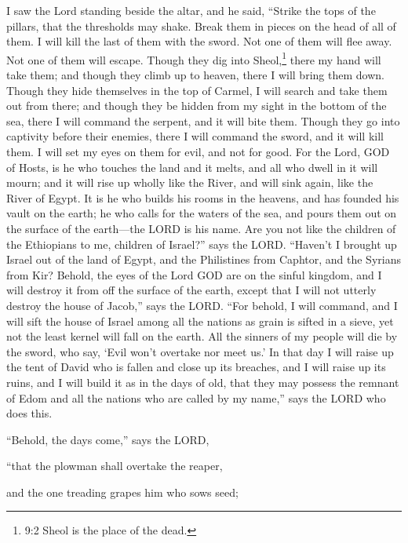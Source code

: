 	
	\mychapter{} \myverse*{}I saw the Lord standing beside the altar, and he said, “Strike
	the tops of the pillars, that the thresholds may shake. Break them in pieces on the head of all of them.
	I will kill the last of them with the sword. Not one of them will flee away. Not one of them will escape.
	\myverse{}Though they dig into Sheol,\footnote{9:2 Sheol is the place of the dead.} there my hand will take them; and though they climb
	up to heaven, there I will bring them down.
	\myverse{}Though they hide themselves in the top of Carmel, I will search and take them
	out from there; and though they be hidden from my sight in the bottom of the sea, there I will command
	the serpent, and it will bite them.
	\myverse{}Though they go into captivity before their enemies, there I will command the
	sword, and it will kill them. I will set my eyes on them for evil, and not for good.
	\myverse{}For the Lord, GOD of Hosts, is he who touches the land and it melts, and all
	who dwell in it will mourn; and it will rise up wholly like the River, and will sink again, like the River
	of Egypt.
	\myverse{}It is he who builds his rooms in the heavens, and has founded his vault on the
	earth; he who calls for the waters of the sea, and pours them out on the surface of the earth—the LORD
	is his name.
	\myverse{}Are you not like the children of the Ethiopians to me, children of Israel?”
	says the LORD. “Haven’t I brought up Israel out of the land of Egypt, and the Philistines from Caphtor,
	and the Syrians from Kir?
	\myverse{}Behold, the eyes of the Lord GOD are on the sinful kingdom, and I will destroy
	it from off the surface of the earth, except that I will not utterly destroy the house of Jacob,” says
	the LORD.
	\myverse{}“For behold, I will command, and I will sift the house of Israel among all the
	nations as grain is sifted in a sieve, yet not the least kernel will fall on the earth.
	\myverse{}All the sinners of my people will die by the sword, who say, ‘Evil won’t overtake
	nor meet us.’
	\myverse{}In that day I will raise up the tent of David who is fallen and close up its
	breaches, and I will raise up its ruins, and I will build it as in the days of old,
	\myverse{}that they may possess the remnant of Edom and all the nations who are called
	by my name,” says the LORD who does this.
	
	\myverse{}“Behold, the days come,” says the LORD,
	
	“that the plowman shall overtake the reaper,
	
	and the one treading grapes him who sows seed;
	
